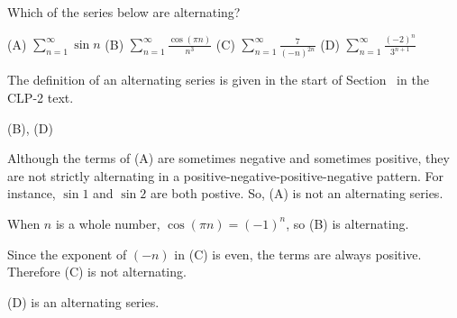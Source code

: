 \begin{question}
Which of the series below are alternating?

\hfill(A) $\displaystyle\sum_{n=1}^\infty \sin n$\hfill
(B) $\displaystyle\sum_{n=1}^\infty \frac{\cos(\pi n)}{n^3}$\hfill
(C) $\displaystyle\sum_{n=1}^\infty \frac{7}{(-n)^{2n}}$\hfill
(D) $\displaystyle\sum_{n=1}^\infty \frac{(-2)^n}{3^{n+1}}$\hfill~
\end{question}
\begin{hint}
The definition of an alternating series is given in the start of Section~
 in the CLP-2 text.
\end{hint}
\begin{answer}
(B), (D)
\end{answer}
\begin{solution}
Although the terms of (A) are sometimes negative and sometimes positive, they are not strictly alternating in a  positive-negative-positive-negative pattern. For instance, $\sin 1$ and $\sin 2$ are both postive. So, (A) is not an alternating series.

When $n$ is a whole number, $\cos(\pi n) = (-1)^n$, so (B) is alternating.

Since the exponent of $(-n)$ in (C) is even, the terms are always positive. Therefore (C) is not alternating.

(D) is an alternating series.
\end{solution}


